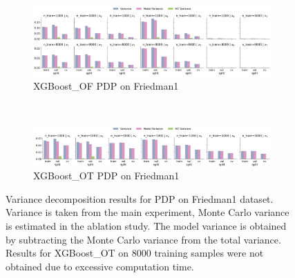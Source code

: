 \documentclass[runningheads]{llncs}
\begin{document}
\begin{figure}[htbp]
    \centering
    \begin{subfigure}[b]{\textwidth}
        \includegraphics[width=\textwidth]{img/Friedman1-all/variance_decomposition_pdp_XGBoost_OF.png}
        \caption{XGBoost\_OF PDP on Friedman1}
    \end{subfigure}
    \\[10pt]
    \vfill
    \begin{subfigure}[b]{\textwidth}
        \includegraphics[width=\textwidth]{img/Friedman1-all/variance_decomposition_pdp_XGBoost_OT.png}
        \caption{XGBoost\_OT PDP on Friedman1}
    \end{subfigure}
    \caption{Variance decomposition results for PDP on Friedman1 dataset. Variance is taken from the
        main experiment, Monte Carlo variance is estimated in the ablation study. The model variance is
        obtained by subtracting the Monte Carlo variance from the total variance. Results for XGBoost\_OT
        on 8000 training samples were not obtained due to excessive computation time.}
    \label{fig:pdp-variance-decomp-friedman1}  %
\end{figure}
\end{document}
